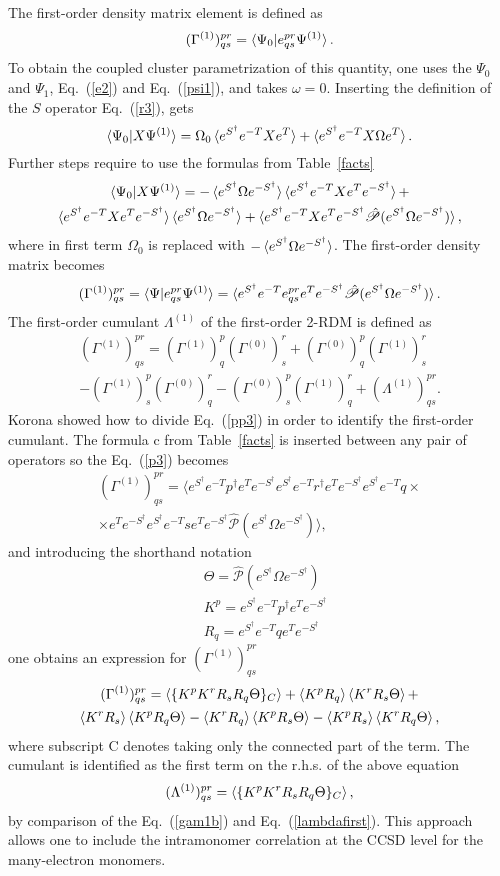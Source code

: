 \documentclass[preprint,12pt]{elsarticle}
\newcommand{\proj}{\hat{\mathscr{P}}}
\newcommand{\kp}{K^p}
\newcommand{\kr}{K^r}
\newcommand{\rqq}{R_q}
\newcommand{\rs}{R_s}
\newcommand{\equ}[1]{\begin{equation} #1 \end{equation}}
\newcommand{\equl}[2]{\begin{equation}\label{#2} #1 \end{equation}}
\newcommand{\equm}[1]{\begin{multline} #1 \end{multline}}
\newcommand{\equml}[2]{\begin{multline}\label{#2} #1 \end{multline}}
\newcommand{\equa}[1]{\begin{align} #1 \end{align}}
\newcommand{\fr}[1]{Eq.~(\ref{#1})}
\newcommand{\Frt}[1]{Table~\ref{#1}}
\newcommand{\esd}{e^{S^\dagger}}
\newcommand{\esdm}{e^{-S^\dagger}}
\newcommand{\etm}{e^{-T}}
\newcommand{\et}{e^{T}}
\begin{document}
The first-order density matrix element is defined as
\equl{(\Gamma^{(1)})^{pr}_{qs} = \braket{\Psi_0|e^{pr}_{qs}\Psi^{(1)}}.
  }{e1}
To obtain the coupled cluster parametrization of this quantity, one uses the $\Psi_0$ and $\Psi_1$, \fr{e2} and \fr{psi1}, and takes $\omega=0$.
Inserting  the definition of the $S$ operator \fr{r3},
gets\cite{korona2008second}
\equl{\braket{\Psi_0|X\Psi^{(1)}} = \Omega_0 \braket{\esd\etm  X \et} + \braket{\esd\etm X \Omega\et}.
}{p1}
Further steps require to use the formulas from \Frt{facts} 
\equml{\braket{\Psi_0|X\Psi^{(1)}} = -\braket{\esd\Omega\esdm} \braket{\esd\etm  X \et\esdm} + \\
  \braket{\esd\etm X \et\esdm}\braket{\esd\Omega\esdm}
  +\braket{\esd\etm X \et\esdm\hat{\mathscr{P}}(\esd\Omega\esdm)},
}{p2}
where in first term  $\Omega_0$ is replaced with $-\braket{\esd\Omega\esdm}$.
The first-order density matrix becomes
\equl{(\Gamma^{(1)})^{pr}_{qs} = \braket{\Psi|e^{pr}_{qs}\Psi^{(1)}} = \braket{\esd\etm e^{pr}_{qs} \et\esdm\hat{\mathscr{P}}(\esd\Omega\esdm)}.
}{pp3}
The first-order cumulant $\Lambda^{(1)}$ of the first-order 2-RDM is defined as
\equml{(\Gamma^{(1)})^{pr}_{qs} =     
  (\Gamma^{(1)})^p_q(\Gamma^{(0)})^r_s +(\Gamma^{(0)})^p_q(\Gamma^{(1)})^r_s  \\-(\Gamma^{(1)})^p_s(\Gamma^{(0)})^r_q
  - (\Gamma^{(0)})^p_s(\Gamma^{(1)})^r_q
  +(\Lambda^{(1)})^{pr}_{qs} .
}{lambdafirst}
Korona\cite{korona2008second} showed how to divide \fr{pp3} in order to identify the first-order cumulant.
The formula c from \Frt{facts} is inserted between any pair of  operators so  the \fr{p3} becomes
\equm{(\Gamma^{(1)})^{pr}_{qs} = \langle\esd\etm p^\dagger\et\esdm\esd\etm r^\dagger \et\esdm\esd\etm q \times \\
  \times\et\esdm\esd\etm s \et\esdm \proj(\esd\Omega\esdm)\rangle,
}
and introducing the shorthand notation
\equa{
  &\Theta = \proj(\esd\Omega\esdm)\\
  &K^p=\esd\etm p^\dagger \et\esdm\nonumber \\
  &R_q=\esd\etm q \et\esdm\nonumber
}
one obtains an expression for $(\Gamma^{(1)})^{pr}_{qs}$ 
\equml{(\Gamma^{(1)})^{pr}_{qs} = \braket{\{K^pK^rR_sR_q\Theta\}_C}
  +\braket{\kp\rqq}\braket{\kr\rs\Theta}+\\
  \braket{\kr\rs}\braket{\kp\rqq\Theta} - \braket{\kr\rqq}\braket{\kp\rs\Theta}
   -\braket{\kp\rs}\braket{\kr\rqq\Theta},
}{gam1b}
where subscript C denotes taking only the connected part of the term.
The cumulant is identified as the first term on the r.h.s. 
of the above equation
\equ{(\Lambda^{(1)})^{pr}_{qs} = \braket{\{K^pK^rR_sR_q\Theta\}_C},
}
by comparison of the \fr{gam1b} and \fr{lambdafirst}.
This approach allows one to include the intramonomer correlation at the CCSD level for the many-electron monomers. 
\end{document}
